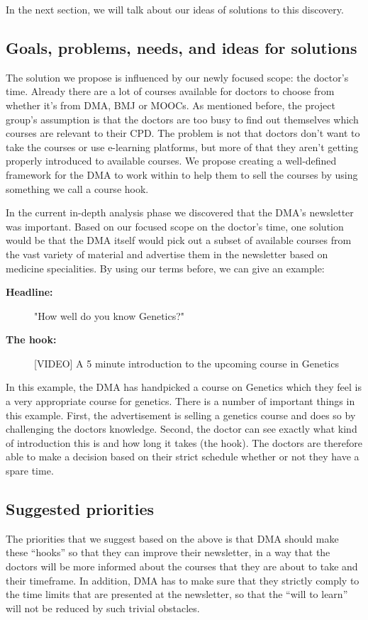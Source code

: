 In the next section, we will talk about our ideas of solutions to this discovery.

\subsection{Goals, problems, needs, and ideas for solutions}
The solution we propose is influenced by our newly focused scope: the doctor's time. Already there are a lot of courses available for doctors to choose from whether it’s from DMA, BMJ or MOOCs. As mentioned before, the project group’s assumption is that the doctors are too busy to find out themselves which courses are relevant to their CPD. The problem is not that doctors don’t want to take the courses or use e-learning platforms, but more of that they aren’t getting properly introduced to available courses. We propose creating a well-defined framework for the DMA to work within to help them to sell the courses by using something we call a course hook.

In the current in-depth analysis phase we discovered that the DMA’s newsletter was important. Based on our focused scope on the doctor's time, one solution would be that the DMA itself would pick out a subset of available courses from the vast variety of material and advertise them in the newsletter based on medicine specialities. By using our terms before, we can give an example:

\begin{description}
    \item[\textbf{Headline:}] "How well do you know Genetics?"
    \item[\textbf{The hook:}] [VIDEO] A 5 minute introduction to the upcoming course in Genetics
\end{description}

In this example, the DMA has handpicked a course on Genetics which they feel is a very appropriate course for genetics. There is a number of important things in this example. First, the advertisement is selling a genetics course and does so by challenging the doctors knowledge. Second, the doctor can see exactly what kind of introduction this is and how long it takes (the hook). The doctors are therefore able to make a decision based on their strict schedule whether or not they have a spare time.

\subsection{Suggested priorities}
The priorities that we suggest based on the above is that DMA should make these “hooks” so that they can improve their newsletter, in a way that the doctors will be more informed about the courses that they are about to take and their timeframe. In addition, DMA has to make sure that they strictly comply to the time limits that are presented at the newsletter, so that the “will to learn” will not be reduced by such trivial obstacles.

